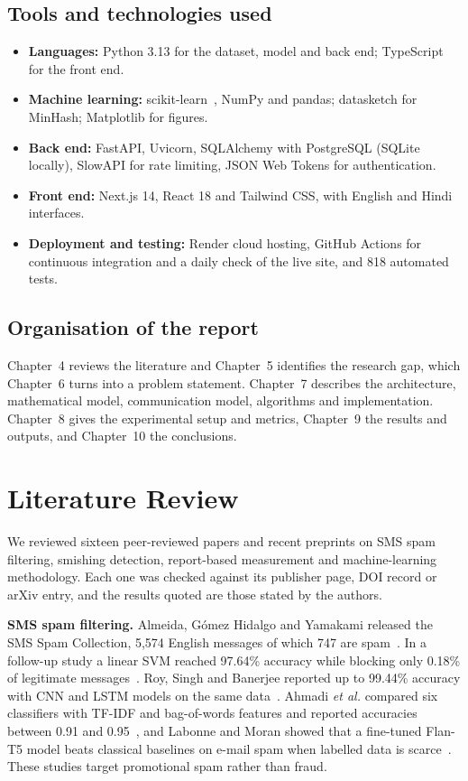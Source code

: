 \documentclass[12pt,a4paper]{report}
\begin{document}
\section{Tools and technologies used}
\begin{itemize}
\item \textbf{Languages:} Python 3.13 for the dataset, model and back end; TypeScript for the front end.
\item \textbf{Machine learning:} scikit-learn~\cite{pedregosa2011scikit}, NumPy and pandas; datasketch for MinHash; Matplotlib for figures.
\item \textbf{Back end:} FastAPI, Uvicorn, SQLAlchemy with PostgreSQL (SQLite locally), SlowAPI for rate limiting, JSON Web Tokens for authentication.
\item \textbf{Front end:} Next.js 14, React 18 and Tailwind CSS, with English and Hindi interfaces.
\item \textbf{Deployment and testing:} Render cloud hosting, GitHub Actions for continuous integration and a daily check of the live site, and 818 automated tests.
\end{itemize}

\section{Organisation of the report}
Chapter~4 reviews the literature and Chapter~5 identifies the research gap, which Chapter~6 turns into a problem statement. Chapter~7 describes the architecture, mathematical model, communication model, algorithms and implementation. Chapter~8 gives the experimental setup and metrics, Chapter~9 the results and outputs, and Chapter~10 the conclusions.

\chapter{Literature Review}
We reviewed sixteen peer-reviewed papers and recent preprints on SMS spam filtering, smishing detection, report-based measurement and machine-learning methodology. Each one was checked against its publisher page, DOI record or arXiv entry, and the results quoted are those stated by the authors.

\textbf{SMS spam filtering.} Almeida, G\'omez Hidalgo and Yamakami released the SMS Spam Collection, 5,574 English messages of which 747 are spam~\cite{almeida2011contributions}. In a follow-up study a linear SVM reached 97.64\% accuracy while blocking only 0.18\% of legitimate messages~\cite{almeida2013towards}. Roy, Singh and Banerjee reported up to 99.44\% accuracy with CNN and LSTM models on the same data~\cite{roy2020deep}. Ahmadi \textit{et al.} compared six classifiers with TF-IDF and bag-of-words features and reported accuracies between 0.91 and 0.95~\cite{ahmadi2025llm}, and Labonne and Moran showed that a fine-tuned Flan-T5 model beats classical baselines on e-mail spam when labelled data is scarce~\cite{labonne2023spamt5}. These studies target promotional spam rather than fraud.
\end{document}

